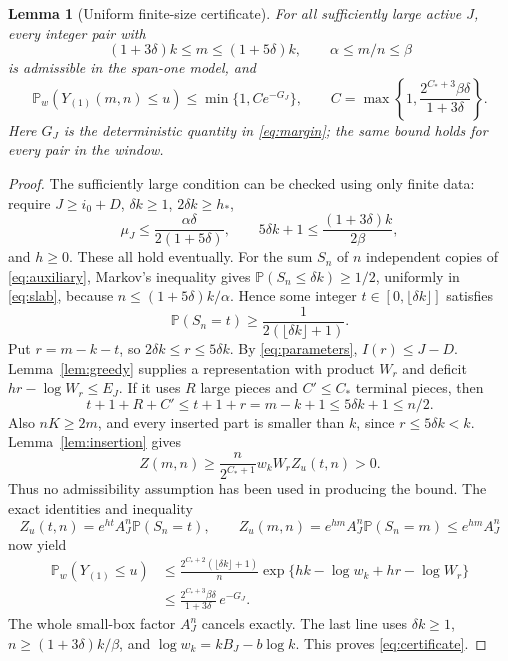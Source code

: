 \documentclass[11pt]{amsart}
\newtheorem{lemma}[theorem]{Lemma}
\theoremstyle{remark}\newtheorem{remark}[theorem]{Remark}
\newcommand{\Pp}{\mathbb P}
\begin{document}
\begin{lemma}[Uniform finite-size certificate]\label{lem:certificate}
For all sufficiently large active $J$, every integer pair with
\begin{equation}\label{eq:slab}
 (1+3\delta)k\le m\le(1+5\delta)k,\qquad
 \alpha\le m/n\le\beta
\end{equation}
is admissible in the span-one model, and
\begin{equation}\label{eq:certificate}
 \Pp_w(Y_{(1)}(m,n)\le u)\le\min\{1,C e^{-G_J}\},\qquad
 C=\max\left\{1,\frac{2^{C_*+3}\beta\delta}{1+3\delta}\right\}.
\end{equation}
Here $G_J$ is the deterministic quantity in \eqref{eq:margin}; the same
bound holds for every pair in the window.
\end{lemma}

\begin{proof}
The sufficiently large condition can be checked using only finite data:
require $J\ge i_0+D$, $\delta k\ge1$, $2\delta k\ge h_*$,
\begin{equation}\label{eq:finiteconditions}
 \mu_J\le\frac{\alpha\delta}{2(1+5\delta)},\qquad
 5\delta k+1\le\frac{(1+3\delta)k}{2\beta},
\end{equation}
and $h\ge0$. These all hold eventually. For the sum $S_n$ of $n$
independent copies of \eqref{eq:auxiliary}, Markov's inequality gives
$\Pp(S_n\le\delta k)\ge1/2$, uniformly in \eqref{eq:slab}, because
$n\le(1+5\delta)k/\alpha$. Hence some integer
$t\in[0,\lfloor\delta k\rfloor]$ satisfies
\begin{equation}\label{eq:atom}
 \Pp(S_n=t)\ge\frac1{2(\lfloor\delta k\rfloor+1)}.
\end{equation}
Put $r=m-k-t$, so $2\delta k\le r\le5\delta k$. By
\eqref{eq:parameters}, $I(r)\le J-D$. Lemma~\ref{lem:greedy} supplies a
representation with product $W_r$ and deficit $hr-\log W_r\le E_J$.
If it uses $R$ large pieces and $C'\le C_*$ terminal pieces, then
\[
 t+1+R+C'\le t+1+r=m-k+1\le5\delta k+1\le n/2.
\]
Also $nK\ge2m$, and every inserted part is smaller than $k$, since
$r\le5\delta k<k$. Lemma~\ref{lem:insertion} gives
\[
 Z(m,n)\ge\frac{n}{2^{C_*+1}}w_kW_r Z_u(t,n)>0.
\]
Thus no admissibility assumption has been used in producing the bound.
The exact identities and inequality
\[
 Z_u(t,n)=e^{ht}A_J^n\Pp(S_n=t),\qquad
 Z_u(m,n)=e^{hm}A_J^n\Pp(S_n=m)\le e^{hm}A_J^n
\]
now yield
\begin{align*}
 \Pp_w(Y_{(1)}\le u)
 &\le\frac{2^{C_*+2}(\lfloor\delta k\rfloor+1)}n
       \exp\{hk-\log w_k+hr-\log W_r\}\\
 &\le\frac{2^{C_*+3}\beta\delta}{1+3\delta}\,e^{-G_J}.
\end{align*}
The whole small-box factor $A_J^n$ cancels exactly. The last line uses
$\delta k\ge1$, $n\ge(1+3\delta)k/\beta$, and
$\log w_k=kB_J-b\log k$. This proves \eqref{eq:certificate}.
\end{proof}
\end{document}
